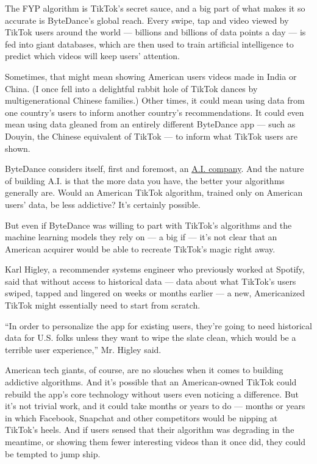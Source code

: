 The FYP algorithm is TikTok's secret sauce, and a big part of what makes
it so accurate is ByteDance's global reach. Every swipe, tap and video
viewed by TikTok users around the world --- billions and billions of
data points a day --- is fed into giant databases, which are then used
to train artificial intelligence to predict which videos will keep
users' attention.

Sometimes, that might mean showing American users videos made in India
or China. (I once fell into a delightful rabbit hole of TikTok dances by
multigenerational Chinese families.) Other times, it could mean using
data from one country's users to inform another country's
recommendations. It could even mean using data gleaned from an entirely
different ByteDance app --- such as Douyin, the Chinese equivalent of
TikTok --- to inform what TikTok users are shown.

ByteDance considers itself, first and foremost, an
\href{https://fortune.com/longform/tiktok-app-artificial-intelligence-addictive-bytedance-china/}{A.I.
company}. And the nature of building A.I. is that the more data you
have, the better your algorithms generally are. Would an American TikTok
algorithm, trained only on American users' data, be less addictive? It's
certainly possible.

But even if ByteDance was willing to part with TikTok's algorithms and
the machine learning models they rely on --- a big if --- it's not clear
that an American acquirer would be able to recreate TikTok's magic right
away.

Karl Higley, a recommender systems engineer who previously worked at
Spotify, said that without access to historical data --- data about what
TikTok's users swiped, tapped and lingered on weeks or months earlier
--- a new, Americanized TikTok might essentially need to start from
scratch.

``In order to personalize the app for existing users, they're going to
need historical data for U.S. folks unless they want to wipe the slate
clean, which would be a terrible user experience,'' Mr. Higley said.

American tech giants, of course, are no slouches when it comes to
building addictive algorithms. And it's possible that an American-owned
TikTok could rebuild the app's core technology without users even
noticing a difference. But it's not trivial work, and it could take
months or years to do --- months or years in which Facebook, Snapchat
and other competitors would be nipping at TikTok's heels. And if users
sensed that their algorithm was degrading in the meantime, or showing
them fewer interesting videos than it once did, they could be tempted to
jump ship.

